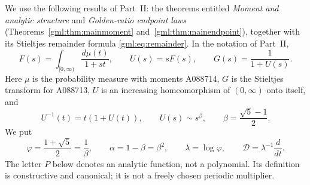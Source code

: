 \documentclass[11pt]{article}
\numberwithin{equation}{section}
\theoremstyle{definition}
\theoremstyle{remark}
\begin{document}
We use the following results of Part~II: the theorems entitled
\emph{Moment and analytic structure} and \emph{Golden-ratio endpoint laws}
(Theorems~\ref{gml:thm:mainmoment} and~\ref{gml:thm:mainendpoint}),
together with its Stieltjes remainder formula \eqref{gml:eq:remainder}.
In the notation of Part~II,
\begin{equation}\label{gdy:dyn:eq:input}
 F(s)=\int_{[0,\infty)}\frac{d\mu(t)}{1+st},\qquad
 U(s)=sF(s),\qquad G(s)=\frac{1}{1+U(s)}.
\end{equation}
Here $\mu$ is the probability measure with moments A088714, $G$ is the
Stieltjes transform for A088713, $U$ is an increasing homeomorphism of
$(0,\infty)$ onto itself, and
\begin{equation}\label{gdy:dyn:eq:inverse}
 U^{-1}(t)=t(1+U(t)),\qquad
 U(s)\sim s^\beta,
 \qquad \beta=\frac{\sqrt5-1}{2}.
\end{equation}
We put
\begin{equation}\label{gdy:dyn:eq:constants}
 \varphi=\frac{1+\sqrt5}{2}=\frac1\beta,\qquad
 \alpha=1-\beta=\beta^2,\qquad \lambda=\log\varphi,
 \qquad \mathcal D=\lambda^{-1}\frac{d}{dt}.
\end{equation}
The letter $P$ below denotes an analytic function, not a polynomial. Its
definition is constructive and canonical; it is not a freely chosen
periodic multiplier.
\end{document}
